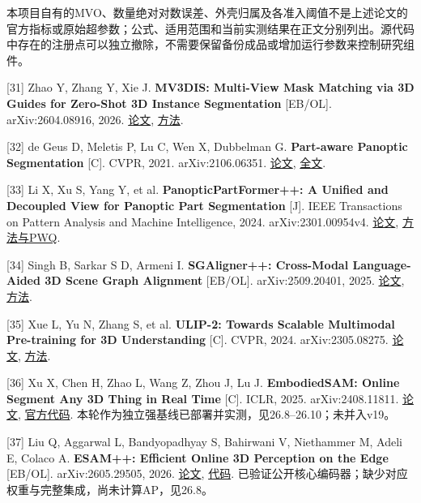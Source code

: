 \documentclass[UTF8,fontset=fandol]{ctexart}
\begin{document}
本项目自有的MVO、数量绝对对数误差、外壳归属及各准入阈值不是上述论文的官方指标或原始超参数；公式、适用范围和当前实测结果在正文分别列出。源代码中存在的注册点可以独立撤除，不需要保留备份成品或增加运行参数来控制研究组件。



[31] Zhao Y, Zhang Y, Xie J. \textbf{MV3DIS: Multi-View Mask Matching via 3D Guides for Zero-Shot 3D Instance Segmentation} [EB/OL]. arXiv:2604.08916, 2026. \href{https://arxiv.org/abs/2604.08916}{论文}, \href{https://arxiv.org/html/2604.08916v1}{方法}.



[32] de Geus D, Meletis P, Lu C, Wen X, Dubbelman G. \textbf{Part-aware Panoptic Segmentation} [C]. CVPR, 2021. arXiv:2106.06351. \href{https://arxiv.org/abs/2106.06351}{论文}, \href{https://arxiv.org/pdf/2106.06351}{全文}.



[33] Li X, Xu S, Yang Y, et al. \textbf{PanopticPartFormer++: A Unified and Decoupled View for Panoptic Part Segmentation} [J]. IEEE Transactions on Pattern Analysis and Machine Intelligence, 2024. arXiv:2301.00954v4. \href{https://arxiv.org/abs/2301.00954}{论文}, \href{https://arxiv.org/html/2301.00954v4}{方法与PWQ}.



[34] Singh B, Sarkar S D, Armeni I. \textbf{SGAligner++: Cross-Modal Language-Aided 3D Scene Graph Alignment} [EB/OL]. arXiv:2509.20401, 2025. \href{https://arxiv.org/abs/2509.20401}{论文}, \href{https://arxiv.org/html/2509.20401v1}{方法}.



[35] Xue L, Yu N, Zhang S, et al. \textbf{ULIP-2: Towards Scalable Multimodal Pre-training for 3D Understanding} [C]. CVPR, 2024. arXiv:2305.08275. \href{https://arxiv.org/abs/2305.08275}{论文}, \href{https://arxiv.org/html/2305.08275v4}{方法}.



[36] Xu X, Chen H, Zhao L, Wang Z, Zhou J, Lu J. \textbf{EmbodiedSAM: Online Segment Any 3D Thing in Real Time} [C]. ICLR, 2025. arXiv:2408.11811. \href{https://proceedings.iclr.cc/paper\_files/paper/2025/file/5e68f9149d33a6c8ad59ed60bf90606f-Paper-Conference.pdf}{论文}, \href{https://github.com/xuxw98/ESAM}{官方代码}. 本轮作为独立强基线已部署并实测，见26.8–26.10；未并入v19。



[37] Liu Q, Aggarwal L, Bandyopadhyay S, Bahirwani V, Niethammer M, Adeli E, Colaco A. \textbf{ESAM++: Efficient Online 3D Perception on the Edge} [EB/OL]. arXiv:2605.29505, 2026. \href{https://arxiv.org/html/2605.29505v1}{论文}, \href{https://github.com/google/esamplusplus}{代码}. 已验证公开核心编码器；缺少对应权重与完整集成，尚未计算AP，见26.8。
\end{document}
